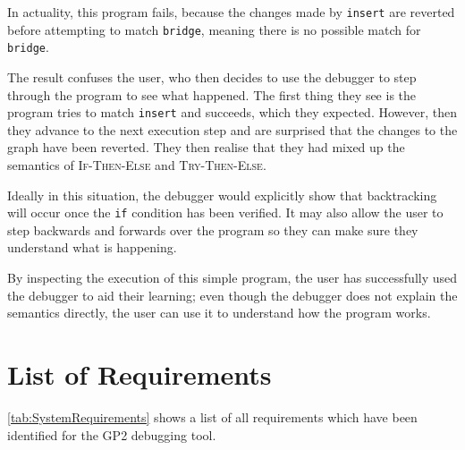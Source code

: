 \documentclass[authoryearcitations]{UoYCSproject}
\begin{document}
In actuality, this program fails, because the changes made by \texttt{insert}
are reverted before attempting to match \texttt{bridge}, meaning there is no
possible match for \texttt{bridge}.

The result confuses the user, who then decides to use the debugger to step
through the program to see what happened. The first thing they see is the
program tries to match \texttt{insert} and succeeds, which they expected.
However, then they advance to the next execution step and are surprised that
the changes to the graph have been reverted. They then realise that they had mixed
up the semantics of \textsc{If-Then-Else} and \textsc{Try-Then-Else}.

Ideally in this situation, the debugger would explicitly show that backtracking
will occur once the \texttt{if} condition has been verified. It may also allow
the user to step backwards and forwards over the program so they can make sure
they understand what is happening.

By inspecting the execution of this simple program, the user has successfully
used the debugger to aid their learning; even though the debugger does not
explain the semantics directly, the user can use it to understand how the
program works.


\section{List of Requirements}
\label{sec:ListOfRequirements}

\autoref{tab:SystemRequirements} shows a list of all requirements which have
been identified for the GP2 debugging tool.
\end{document}

